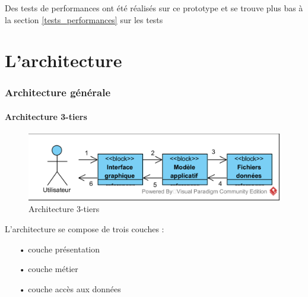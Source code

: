 \documentclass[12pt]{article}
\begin{document}
	Des tests de performances ont été réalisés sur ce prototype et se trouve plus bas à la
	section \ref{tests_performances} sur les tests\.\\

\newpage
\part{L'architecture}

	\section{Architecture générale}
		\subsection{Architecture 3-tiers}
		\begin{figure}[!h]
		\begin{center}
		\includegraphics[scale=1]{dia_block_3tiers.png}
		\caption{Architecture 3-tiers}
		\end{center}
		\end{figure}
		
		L’architecture se compose de trois couches :
		\begin{itemize}
			\item[•]couche présentation
			\item[•]couche métier 
			\item[•]couche accès aux données\\
		\end{itemize}
			
\end{document}
